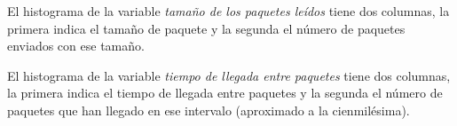 \documentclass[a4paper, 11pt]{article}	%
\begin{document}
El histograma de la variable \textit{tamaño de los paquetes leídos} tiene dos columnas, la primera indica el tamaño de paquete y la segunda el número de paquetes enviados con ese tamaño.

El histograma de la variable \textit{tiempo de llegada entre paquetes} tiene dos columnas, la primera indica el tiempo de llegada entre paquetes y la segunda el número de paquetes que han llegado en ese intervalo (aproximado a la cienmilésima).
\end{document}
